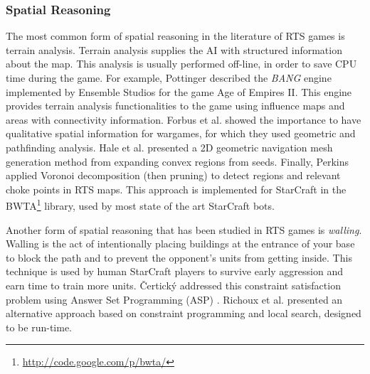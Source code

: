 \documentclass{llncs}
\begin{document}
\subsubsection*{Spatial Reasoning}
The most common form of spatial reasoning in the literature of RTS games is terrain analysis.
Terrain analysis supplies  the AI
with structured information  about the map.  This  analysis is usually
performed off-line,  in order to  save CPU  time during the  game. For
example, Pottinger \cite{Pottinger00} described the \emph{BANG} engine
implemented by Ensemble  Studios for the game Age of  Empires II. This
engine  provides terrain  analysis functionalities  to the  game using
influence maps and areas with connectivity information.  Forbus et al.
\cite{Forbus2002} showed  the importance  to have  qualitative spatial
information  for   wargames,  for   which  they  used   geometric  and
pathfinding  analysis.   Hale  et  al. \cite{Hale08}  presented  a  2D
geometric  navigation mesh  generation  method  from expanding  convex
regions from seeds.  Finally, Perkins \cite{Perkins10} applied Voronoi
decomposition (then pruning) %
to detect regions and relevant choke points in RTS maps. This approach
is        implemented        for        StarCraft        in        the
BWTA\footnote{\url{http://code.google.com/p/bwta/}}  library, used  by
most state of the art StarCraft bots.

Another form of spatial reasoning that has been studied in RTS games is {\em walling}. Walling is the act of  intentionally placing buildings at the entrance
of your  base to block  the path and  to prevent the  opponent's units
from getting inside. This technique is used by human StarCraft players
to   survive  early   aggression   and  earn   time   to  train   more
units.  \v{C}ertick\'{y} addressed  this constraint  satisfaction problem
using Answer Set Programming (ASP) \cite{certicky2013wallin}. Richoux et al. \cite{richoux2014walling} presented an alternative approach based on constraint programming and local search, designed to be run-time.

\end{document}
